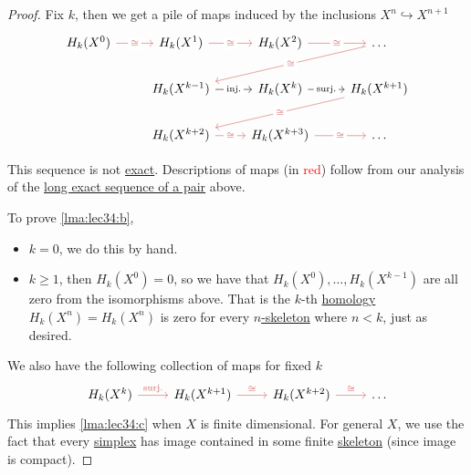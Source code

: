 \begin{proof}
	Fix \(k\), then we get a pile of maps induced by the inclusions \(X^n \hookrightarrow X^{n + 1}\)
	\[
		\begin{tikzcd}
			{H_k(X^0)} & {H_k(X^1)} & {H_k(X^2)} & \dots \\
			& {H_k(X^{k-1})} & {H_k(X^{k})} & {H_k(X^{k+1})} \\
			& {H_k(X^{k+2})} & {H_k(X^{k+3})} & \dots
			\arrow["\cong"{description}, color={rgb,255:red,214;green,92;blue,92}, from=1-4, to=2-2]
			\arrow["{\text{inj.}}"{description}, from=2-2, to=2-3]
			\arrow["{\text{surj.}}"{description}, from=2-3, to=2-4]
			\arrow["\cong"{description}, color={rgb,255:red,214;green,92;blue,92}, from=2-4, to=3-2]
			\arrow["\cong"{description}, color={rgb,255:red,214;green,92;blue,92}, from=3-2, to=3-3]
			\arrow["\cong"{description}, color={rgb,255:red,214;green,92;blue,92}, from=3-3, to=3-4]
			\arrow["\cong"{description}, color={rgb,255:red,214;green,92;blue,92}, from=1-1, to=1-2]
			\arrow["\cong"{description}, color={rgb,255:red,214;green,92;blue,92}, from=1-2, to=1-3]
			\arrow["\cong"{description}, color={rgb,255:red,214;green,92;blue,92}, from=1-3, to=1-4]
		\end{tikzcd}
	\]
	\begin{note}
		This sequence is not \hyperref[def:exact-sequence]{exact}. Descriptions of maps (in \textcolor{red}{red}) follow from our analysis of the \hyperref[thm:long-exact-sequence-of-a-pair]{long exact sequence of a pair} above.
	\end{note}

	To prove \autoref{lma:lec34:b},
	\begin{itemize}
		\item \(k = 0\), we do this by hand.
		\item \(k \geq 1\), then \(H_k(X^0) = 0\), so we have that \(H_k(X^0), \dots, H_k(X^{k - 1})\) are all zero from the isomorphisms above. That is the \(k\)-th \hyperref[def:singular-homology-group]{homology} \(H_k(X^n) = H_k(X^n)\) is zero for every \hyperref[def:skeleton]{\(n\)-skeleton} where \(n < k\), just as desired.
	\end{itemize}
	We also have the following collection of maps for fixed \(k\)
	\[
		\begin{tikzcd}
			{H_k(X^k)} & {H_k(X^{k+1})} & {H_k(X^{k+2})} & \dots
			\arrow["{\text{surj.}}", color={rgb,255:red,214;green,92;blue,92}, from=1-1, to=1-2]
			\arrow["\cong", color={rgb,255:red,214;green,92;blue,92}, from=1-2, to=1-3]
			\arrow["\cong", color={rgb,255:red,214;green,92;blue,92}, from=1-3, to=1-4]
		\end{tikzcd}
	\]
	This implies \autoref{lma:lec34:c} when \(X\) is finite dimensional. For general \(X\), we use the fact that every \hyperref[def:standard-simplex]{simplex} has image contained in some finite \hyperref[def:skeleton]{skeleton} (since image is compact).
\end{proof}

